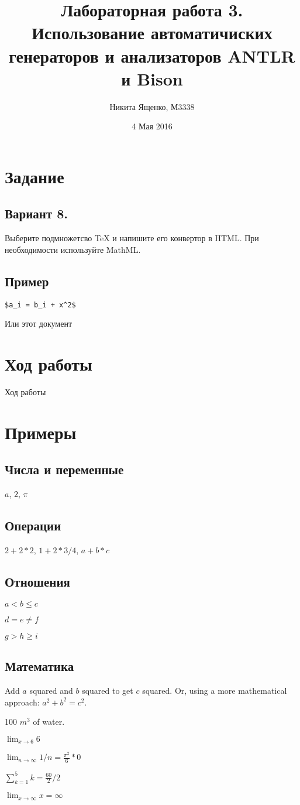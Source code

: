 \documentclass[11pt,oneside,a4paper]{article}
\title{Лабораторная работа 3. Использование автоматичиских генераторов и анализаторов ANTLR и Bison}
\author{Никита Ященко, М3338}
\date{4 Мая 2016}
\begin{document}
\maketitle

\section{Задание}
\subsection{Вариант 8.}
 
Выберите подмножетсво TeX и напишите его конвертор в HTML.
При необходимости используйте MathML.

\subsection{Пример}

\begin{verbatim}
$a_i = b_i + x^2$
\end{verbatim}

Или этот документ

\section{Ход работы}
 
Ход работы
 
\section{Примеры}

\subsection{Числа и переменные}

$a$, $2$, $\pi$

\subsection{Операции}

$2 + 2 * 2$, $1 + 2 * 3 / 4$, $a + b * c$
 
\subsection{Отношения}

$a < b \le c$

$d = e \ne f$

$g > h \ge i$

\subsection{Математика}

Add $a$ squared and $b$ squared to get $c$ squared.
Or, using a more mathematical approach: $a^2 + b^{2} = c^2$.

100 $m^{3}$ of water.

$\lim_{x \to 6}{6}$

$\lim_{n \to \infty}{1/n} = \frac{\pi^2}{6} * 0$

$\sum_{k=1}^{5}{k} = \frac{60}{2}/2$

$\lim_{x \to \infty}{x} = \infty$
 
\end{document}
